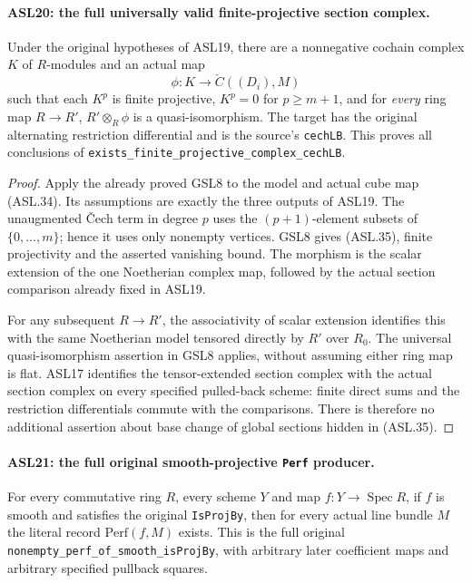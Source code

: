 \documentclass[11pt,a4paper]{article}
\numberwithin{equation}{section}
\theoremstyle{remark}\newtheorem{remark}[theorem]{Remark}
\begin{document}
\paragraph{ASL20: the full universally valid finite-projective section complex.}
\label{claim:ASL20}
Under the original hypotheses of ASL19, there are a
nonnegative cochain complex $K$ of $R$-modules and an actual
map
\[
                 \phi:K\longrightarrow\check C((D_i),M)
                                                        \tag{ASL.35}
\]
such that each $K^p$ is finite projective, $K^p=0$ for
$p\ge m+1$, and for \emph{every} ring map $R\to R'$,
$R'\otimes_R\phi$ is a quasi-isomorphism.  The target has
the original alternating restriction differential and is the
source's \texttt{cech\allowbreak{}LB}.  This proves all conclusions of
\texttt{exists\_\allowbreak{}finite\_\allowbreak{}projective\_\allowbreak{}complex\_\allowbreak{}cech\allowbreak{}LB}.

\begin{proof}
Apply the already proved GSL8 to the model and actual cube
map (ASL.34).  Its assumptions are exactly the three
outputs of ASL19.  The unaugmented \v Cech term in degree
$p$ uses the $(p+1)$-element subsets of
$\{0,\ldots,m\}$; hence it uses only nonempty vertices.
GSL8 gives (ASL.35), finite projectivity and the asserted
vanishing bound.  The morphism is the scalar extension of
the one Noetherian complex map, followed by the actual
section comparison already fixed in ASL19.

For any subsequent $R\to R'$, the associativity of scalar
extension identifies this with the same Noetherian model
tensored directly by $R'$ over $R_0$.  The universal
quasi-isomorphism assertion in GSL8 applies, without assuming
either ring map is flat.  ASL17 identifies the tensor-extended
section complex with the actual section complex on every
specified pulled-back scheme: finite direct sums and the
restriction differentials commute with the comparisons.
There is therefore no additional assertion about base change
of global sections hidden in (ASL.35).
\end{proof}

\paragraph{ASL21: the full original smooth-projective \texttt{Perf} producer.}
\label{claim:ASL21}
For every commutative ring $R$, every scheme $Y$ and map
$f:Y\to\operatorname{Spec}R$, if $f$ is smooth and satisfies
the original \texttt{Is\allowbreak{}Proj\allowbreak{}By}, then for every actual line
bundle $M$ the literal record $\mathrm{Perf}(f,M)$ exists.
This is the full original
\texttt{nonempty\_\allowbreak{}perf\_\allowbreak{}of\_\allowbreak{}smooth\_\allowbreak{}is\allowbreak{}Proj\allowbreak{}By}, with arbitrary
later coefficient maps and arbitrary specified pullback squares.
\end{document}
